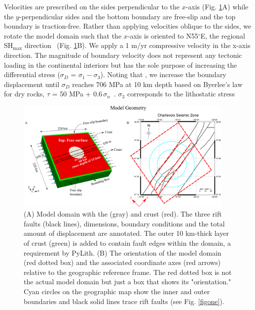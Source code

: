 \documentclass[draft]{agujournal2018}
\begin{document}
Velocities are prescribed on the sides perpendicular to the $x$-axis (Fig. \ref{figtwo}A) while the $y$-perpendicular sides and the bottom boundary are free-slip and the top boundary is traction-free. Rather than applying velocities oblique to the sides, we rotate the model domain such that the $x$-axis is oriented to N55$^\circ$E, the regional SH$_{\max}$ direction~\citep{Zoback_1992} (Fig. \ref{figtwo}B). We apply a 1 m/yr compressive velocity in the x-axis direction. The magnitude of boundary velocity does not represent any tectonic loading in the continental interiors but has the sole purpose of increasing the differential stress ($\sigma_D$ = $\sigma_1 - \sigma_3$). Noting that  \citep{Baird_2010,Powell_2017}, we increase the boundary displacement until $\sigma_D$ reaches 706 MPa at 10 km depth based on Byerlee's law for dry rocks, $\tau$  = 50 MPa + 0.6$\,\sigma_n$~\citep{Byerlee_1978}.  $\sigma_3$ corresponds to the lithostatic stress 

\begin{figure}[ht]
\centering
\includegraphics[width=25pc]{Figures/model_geometry.png}
\caption{(A) Model domain with the  (gray) and crust (red). The three rift faults (black lines), dimensions, boundary conditions and the total amount of displacement are annotated. The outer 10 km-thick layer of crust (green) is added to contain fault edges within the domain, a requirement by PyLith. (B) The orientation of the model domain (red dotted box) and the associated coordinate axes (red arrows) relative to the geographic reference frame. The red dotted box is not the actual model domain but just a box that shows its "orientation." Cyan circles on the geographic map show the inner and outer  boundaries and black solid lines trace rift faults (see Fig. \ref{figone}).}
\label{figtwo}
\end{figure}
\end{document}
